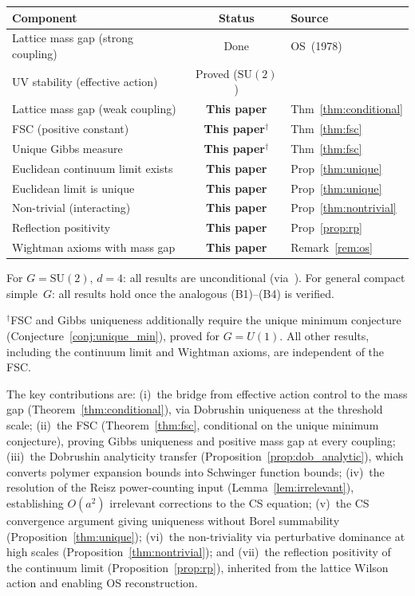 \documentclass[11pt,a4paper]{article}
\theoremstyle{plain}
\theoremstyle{definition}
\theoremstyle{remark}
\newcommand{\SU}{\mathrm{SU}}
\begin{document}
\begin{center}
\renewcommand{\arraystretch}{1.3}
\begin{tabular}{@{}p{5.5cm}cl@{}}
\toprule
\textbf{Component} & \textbf{Status} &
\textbf{Source} \\ \midrule
Lattice mass gap (strong coupling)
  & Done & OS~(1978) \\
UV stability (effective action)
  & Proved ($\SU(2)$) & \cite{FontesSU2} \\
Lattice mass gap (weak coupling)
  & \textbf{This paper} & Thm~\ref{thm:conditional} \\
FSC (positive constant)
  & \textbf{This paper}${}^\dagger$ & Thm~\ref{thm:fsc} \\
Unique Gibbs measure
  & \textbf{This paper}${}^\dagger$ & Thm~\ref{thm:fsc} \\
Euclidean continuum limit exists
  & \textbf{This paper} & Prop~\ref{thm:unique} \\
Euclidean limit is unique
  & \textbf{This paper} & Prop~\ref{thm:unique} \\
Non-trivial (interacting)
  & \textbf{This paper} & Prop~\ref{thm:nontrivial} \\
Reflection positivity
  & \textbf{This paper} & Prop~\ref{prop:rp} \\
Wightman axioms with mass gap
  & \textbf{This paper} & Remark~\ref{rem:os} \\
\bottomrule
\end{tabular}
\end{center}

\noindent
For $G = \SU(2)$, $d = 4$: all results are unconditional
(via~\cite{FontesSU2}).
For general compact simple~$G$: all results hold once
the analogous (B1)--(B4) is verified.

\noindent
{\small ${}^\dagger$FSC and Gibbs uniqueness additionally require
the unique minimum conjecture
(Conjecture~\ref{conj:unique_min}), proved for $G = U(1)$.
All other results, including the continuum limit and
Wightman axioms, are independent of the FSC.}

\medskip
The key contributions are:
(i)~the bridge from effective action control
to the mass gap (Theorem~\ref{thm:conditional}),
via Dobrushin uniqueness at the threshold scale;
(ii)~the FSC
(Theorem~\ref{thm:fsc}, conditional on the unique minimum
conjecture), proving Gibbs uniqueness and positive mass gap
at every coupling;
(iii)~the Dobrushin analyticity transfer
(Proposition~\ref{prop:dob_analytic}), which converts
polymer expansion bounds into Schwinger function bounds;
(iv)~the resolution of the Reisz power-counting input
(Lemma~\ref{lem:irrelevant}), establishing $O(a^2)$
irrelevant corrections to the CS equation;
(v)~the CS convergence argument giving uniqueness
without Borel summability (Proposition~\ref{thm:unique});
(vi)~the non-triviality via perturbative dominance
at high scales (Proposition~\ref{thm:nontrivial});
and (vii)~the reflection positivity of the continuum
limit (Proposition~\ref{prop:rp}), inherited from the
lattice Wilson action and enabling OS reconstruction.
\end{document}
